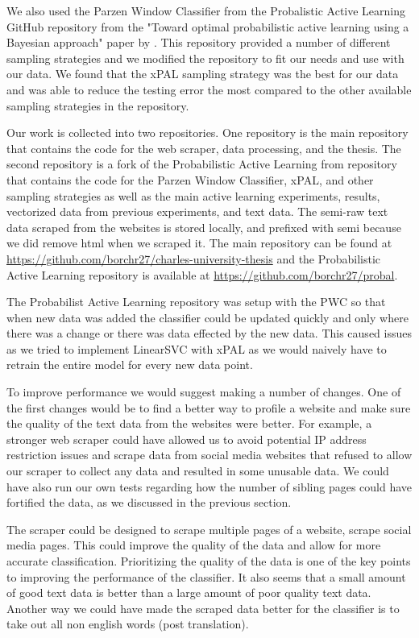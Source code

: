 We also used the Parzen Window Classifier from the Probalistic Active Learning GitHub repository from the "Toward optimal probabilistic active learning using a Bayesian approach" paper by \cite{kottke2021toward}. This repository provided a number of different sampling strategies and we modified the repository to fit our needs and use with our data. We found that the xPAL sampling strategy was the best for our data and was able to reduce the testing error the most compared to the other available sampling strategies in the repository.

Our work is collected into two repositories. One repository is the main repository that contains the code for the web scraper, data processing, and the thesis. The second repository is a fork of the Probabilistic Active Learning from \cite{kottke2021toward} repository that contains the code for the Parzen Window Classifier, xPAL, and other sampling strategies as well as the main active learning experiments, results, vectorized data from previous experiments, and text data. The semi-raw text data scraped from the websites is stored locally, and prefixed with semi because we did remove html when we scraped it. The main repository can be found at \url{https://github.com/borchr27/charles-university-thesis} and the Probabilistic Active Learning repository is available at \url{https://github.com/borchr27/probal}.

The Probabilist Active Learning repository was setup with the PWC so that when new data was added the classifier could be updated quickly and only where there was a change or there was data effected by the new data. This caused issues as we tried to implement LinearSVC with xPAL as we would naively have to retrain the entire model for every new data point.

To improve performance we would suggest making a number of changes. One of the first changes would be to find a better way to profile a website and make sure the quality of the text data from the websites were better. For example, a stronger web scraper could have allowed us to avoid potential IP address restriction issues and scrape data from social media websites that refused to allow our scraper to collect any data and resulted in some unusable data. We could have also run our own tests regarding how the number of sibling pages could have fortified the data, as we discussed in the previous section.

The scraper could be designed to scrape multiple pages of a website, scrape social media pages. This could improve the quality of the data and allow for more accurate classification. Prioritizing the quality of the data is one of the key points to improving the performance of the classifier. It also seems that a small amount of good text data is better than a large amount of poor quality text data. Another way we could have made the scraped data better for the classifier is to take out all non english words (post translation).

